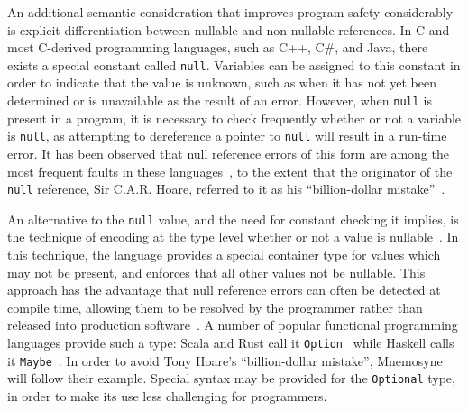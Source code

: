 An additional semantic consideration that improves program safety considerably is explicit differentiation between nullable and non-nullable references. In C and most C-derived programming languages, such as C++, C\#, and Java, there exists a special constant called \texttt{null}. Variables can be assigned to this constant in order to indicate that the value is unknown, such as when it has not yet been determined or is unavailable as the result of an error. However, when \texttt{null} is present in a program, it is necessary to check frequently whether or not a variable is \texttt{null}, as attempting to dereference a pointer to \texttt{null} will result in a run-time error. It has been observed that null reference errors of this form are among the most frequent faults in these languages~\cite{Duff:2009:GNC:1541788.1541792,Chalin:2007:NRD:2394758.2394776,Fahndrich:2003:DCN:949343.949332}, to the extent that the originator of the \texttt{null} reference, Sir C.A.R. Hoare, referred to it as his ``billion-dollar mistake''~\cite{hoare2009null}.

An alternative to the \texttt{null} value, and the need for constant checking it implies, is the technique of encoding at the type level whether or not a value is nullable~\cite{Fahndrich:2003:DCN:949343.949332}. In this technique, the language provides a special container type for values which may not be present, and enforces that all other values not be nullable. This approach has the advantage that null reference errors can often be detected at compile time, allowing them to be resolved by the programmer rather than released into production software~\cite{Fahndrich:2003:DCN:949343.949332}. A number of popular functional programming languages provide such a type: Scala and Rust call it \texttt{Option}~\cite{odersky2004scala,odersky2004overview,Matsakis:2014:RL:2663171.2663188} while Haskell calls it \texttt{Maybe}~\cite{jones2003haskell,hudak1992gentle}. In order to avoid Tony Hoare's ``billion-dollar mistake'', Mnemosyne will follow their example. Special syntax may be provided for the \texttt{Optional} type, in order to make its use less challenging for programmers.



